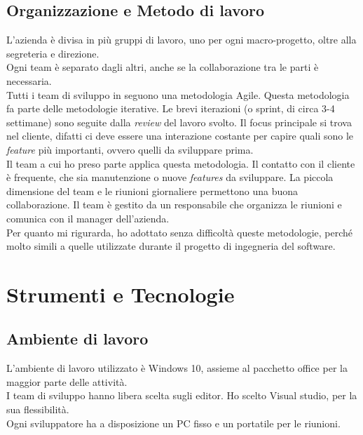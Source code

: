 \subsection{Organizzazione e Metodo di lavoro}
L'azienda è divisa in più gruppi di lavoro, uno per ogni macro-progetto, oltre alla segreteria e direzione.\\
Ogni team è separato dagli altri, anche se la collaborazione tra le parti è necessaria.\\
Tutti i team di sviluppo in \company seguono una metodologia Agile. Questa metodologia fa parte delle metodologie iterative. Le brevi iterazioni (o sprint, di circa 3-4 settimane) sono seguite dalla \textit{review} del lavoro svolto. Il focus principale si trova nel cliente, difatti ci deve essere una interazione costante per capire quali sono le \textit{feature} più importanti, ovvero quelli da sviluppare prima.\\
Il team a cui ho preso parte applica questa metodologia. Il contatto con il cliente è frequente, che sia manutenzione o nuove \textit{features} da sviluppare. La piccola dimensione del team e le riunioni giornaliere permettono una buona collaborazione. Il team è gestito da un responsabile che organizza le riunioni e comunica con il manager dell'azienda.\\
Per quanto mi rigurarda, ho adottato senza difficoltà queste metodologie, perché molto simili a quelle utilizzate durante il progetto di ingegneria del software.

\section{Strumenti e Tecnologie}

\subsection{Ambiente di lavoro}
L'ambiente di lavoro utilizzato è Windows 10, assieme al pacchetto office per la maggior parte delle attività.\\
I team di sviluppo hanno libera scelta sugli editor. Ho scelto Visual studio, per la sua flessibilità.\\
Ogni sviluppatore ha a disposizione un PC fisso e un portatile per le riunioni.

